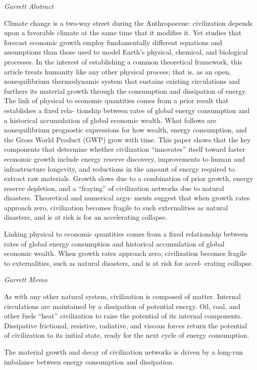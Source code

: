 \documentclass[
]{book}
\begin{document}
\emph{Garrett Abstract}

Climate change is a two-way street during the Anthropocene: civilization depends upon a
favorable climate at the same time that it modiﬁes it. Yet studies that forecast economic growth employ
fundamentally diﬀerent equations and assumptions than those used to model Earth's physical, chemical,
and biological processes. In the interest of establishing a common theoretical framework, this article treats
humanity like any other physical process; that is, as an open, nonequilibrium thermodynamic system that
sustains existing circulations and furthers its material growth through the consumption and dissipation of
energy. The link of physical to economic quantities comes from a prior result that establishes a ﬁxed rela-
tionship between rates of global energy consumption and a historical accumulation of global economic
wealth. What follows are nonequilibrium prognostic expressions for how wealth, energy consumption,
and the Gross World Product (GWP) grow with time. This paper shows that the key components that
determine whether civilization ``innovates'' itself toward faster economic growth include energy reserve
discovery, improvements to human and infrastructure longevity, and reductions in the amount of energy
required to extract raw materials. Growth slows due to a combination of prior growth, energy reserve
depletion, and a ``fraying'' of civilization networks due to natural disasters. Theoretical and numerical argu-
ments suggest that when growth rates approach zero, civilization becomes fragile to such externalities as
natural disasters, and is at risk is for an accelerating collapse.

Linking physical to economic quantities comes from a ﬁxed relationship between rates
of global energy consumption and historical accumulation of global economic wealth. When growth rates
approach zero, civilization becomes fragile to externalities, such as natural disasters, and is at risk for accel-
erating collapse.

\emph{Garrett Memo}

As with any other natural system, civilization is composed of matter. Internal circulations are maintained
by a dissipation of potential energy. Oil, coal, and other fuels ``heat'' civilization to raise the potential of its
internal components. Dissipative frictional, resistive, radiative, and viscous forces return the potential of
civilization to its initial state, ready for the next cycle of energy consumption.

The material growth and decay of civilization networks is
driven by a long-run imbalance between energy consumption and dissipation.
\end{document}
